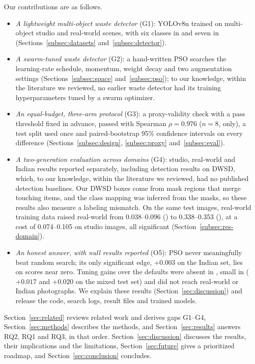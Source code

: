 Our contributions are as follows.
\begin{itemize}
\item \textit{A lightweight multi-object waste detector} (G1): YOLOv8n trained on multi-object studio and real-world scenes, with six classes in \genone and seven in \gentwo (Sections~\ref{subsec:datasets} and~\ref{subsec:detector}).
\item \textit{A swarm-tuned waste detector} (G2): a hand-written PSO searches the learning-rate schedule, momentum, weight decay and two augmentation settings (Sections~\ref{subsec:space} and~\ref{subsec:pso}); to our knowledge, within the literature we reviewed, no earlier waste detector had its training hyperparameters tuned by a swarm optimizer.
\item \textit{An equal-budget, three-arm protocol} (G3): a proxy-validity check with a pass threshold fixed in advance, passed with Spearman $\rho = 0.976$ ($n = 8$, \genone only), a test split used once and paired-bootstrap 95\% confidence intervals on every difference (Sections~\ref{subsec:design}, \ref{subsec:proxy} and~\ref{subsec:eval}).
\item \textit{A two-generation evaluation across domains} (G4): studio, real-world and Indian results reported separately, including detection results on DWSD, which, to our knowledge, within the literature we reviewed, had no published detection baselines. Our DWSD boxes come from mask regions that merge touching items, and the class mapping was inferred from the masks, so these results also measure a labeling mismatch. On the same test images, real-world training data raised real-world \mapfifty from 0.038--0.096 (\genone) to 0.338--0.353 (\gentwo), at a cost of 0.074--0.105 on studio images, all significant (Section~\ref{subsec:res-domain}).
\item \textit{An honest answer, with null results reported} (O5): PSO never meaningfully beat random search; its only significant edge, $+0.003$ \mapfifty on the Indian set, lies on scores near zero. Tuning gains over the defaults were absent in \genone, small in \gentwo ($+0.017$ and $+0.020$ on the mixed test set) and did not reach real-world or Indian photographs. We explain these results (Section~\ref{sec:discussion}) and release the code, search logs, result files and trained models.
\end{itemize}

Section~\ref{sec:related} reviews related work and derives gaps G1--G4, Section~\ref{sec:methods} describes the methods, and Section~\ref{sec:results} answers RQ2, RQ1 and RQ3, in that order. Section~\ref{sec:discussion} discusses the results, their implications and the limitations, Section~\ref{sec:future} gives a prioritized roadmap, and Section~\ref{sec:conclusion} concludes.
